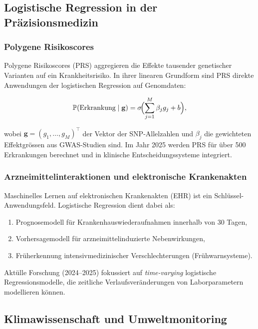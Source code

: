 ﻿\documentclass[12pt, a4paper]{article}
\theoremstyle{definition}
\theoremstyle{remark}
\newcommand{\Prob}{\mathbb{P}}
\newcommand{\sigmoid}{\sigma}
\newcommand{\T}{\top}
\begin{document}
\subsection{Logistische Regression in der Präzisionsmedizin}

\subsubsection{Polygene Risikoscores}

Polygene Risikoscores (PRS) aggregieren die Effekte tausender genetischer Varianten auf ein
Krankheitsrisiko. In ihrer linearen Grundform sind PRS direkte Anwendungen der logistischen
Regression auf Genomdaten:

\begin{equation}
  \Prob(\text{Erkrankung} \mid \mathbf{g}) = \sigmoid\!\Bigl(\sum_{j=1}^M \beta_j g_j + b\Bigr),
\end{equation}

wobei $\mathbf{g} = (g_1,\ldots,g_M)^\T$ der Vektor der SNP-Allelzahlen und $\beta_j$ die
gewichteten Effektgrössen aus GWAS-Studien sind. Im Jahr 2025 werden PRS für über 500
Erkrankungen berechnet und in klinische Entscheidungssysteme integriert.

\subsubsection{Arzneimittelinteraktionen und elektronische Krankenakten}

Maschinelles Lernen auf elektronischen Krankenakten (EHR) ist ein Schlüssel-Anwendungs\-feld.
Logistische Regression dient dabei als:
\begin{enumerate}[label=(\roman*)]
  \item Prognosemodell für Krankenhauswiederaufnahmen innerhalb von 30 Tagen,
  \item Vorhersagemodell für arzneimittelinduzierte Nebenwirkungen,
  \item Früherkennung intensivmedizinischer Verschlechterungen (Frühwarnsysteme).
\end{enumerate}

Aktülle Forschung (2024--2025) fokussiert auf \emph{time-varying} logistische Regressionsmodelle,
die zeitliche Verlaufsveränderungen von Laborparametern modellieren können.

\subsection{Klimawissenschaft und Umweltmonitoring}
\end{document}
